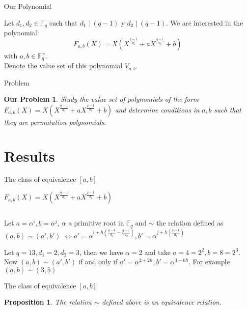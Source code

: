 \documentclass{beamer}
\newtheorem{proposition}{Proposition}
\newtheorem{ourproblem}{Our Problem}
\begin{document}

\begin{frame}{Our Polynomial}
  

  Let $d_1, d_2 \in \mathbb{F}_q$ such that $d_1 \mid (q-1)$ y $d_2 \mid (q-1)$. We are interested in the polynomial:
  {\Large$$F_{a,b}(X) = X(X^{\frac{q-1}{d_1}} + aX^{\frac{q-1}{d_2}} +b)$$ }
  with $a,b \in \mathbb{F}_q^{\times}$. 
  \pause 
  $$$$
  Denote the value set of this polynomial $V_{a,b}$.

\end{frame}

\begin{frame}{Problem}
  \begin{ourproblem}
    Study the value set of polynomials of the form $F_{a,b}(X) = X(X^{\frac{q-1}{d_1}} + aX^{\frac{q-1}{d_2}} +b)$ and determine conditions in $a,b$ such that they are permutation polynomials.
  \end{ourproblem}
\end{frame}

\section{Results} %
\label{sec:results}

\begin{frame}{The class of equivalence $[a,b]$}
  
  {\Large $F_{a,b}(X) = X(X^{\frac{q-1}{d_1}} + aX^{\frac{q-1}{d_2}} +b)$}

  $$$$

  Let $a = \alpha^i, b = \alpha^j$, $\alpha$ a primitive root in $\mathbb{F}_q$ and $\sim$ the relation defined as $(a,b) \sim (a', b')$ 
  $\Longleftrightarrow a' = \alpha^{i+h(\frac{q-1}{d_1} - \frac{q-1}{d_2})}, b' = \alpha^{j+h(\frac{q-1}{d_1})}$

  \begin{example}
    Let $q = 13, d_1 = 2, d_2 = 3$, then we have $\alpha = 2$ and take $a = 4 = 2^2, b = 8 = 2^3$. Now $(a,b) \sim (a',b')$ if and only if
    $a' = \alpha^{2+2h}, b' = \alpha^{3+6h}$. For example $(a,b) \sim (3,5)$
  \end{example}

\end{frame}

\begin{frame}{The class of equivalence $[a,b]$}
  
  \begin{proposition}
    The relation $\sim$ defined above is an equivalence relation.
  \end{proposition}

\end{frame}
\end{document}
